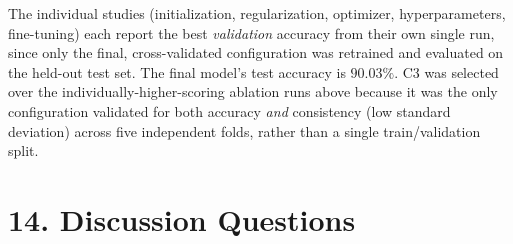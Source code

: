 \documentclass[10pt]{article}
\begin{document}
The individual studies (initialization, regularization,
optimizer, hyperparameters, fine-tuning) each report the best
\emph{validation} accuracy from their own single run, since only the
final, cross-validated configuration was retrained and evaluated on
the held-out test set. The final model's test accuracy is $90.03\%$.  C3 was selected over the
individually-higher-scoring ablation runs above because it was the
only configuration validated for both accuracy \emph{and}
consistency (low standard deviation) across five independent folds,
rather than a single train/validation split.

\section*{14. Discussion Questions}
\end{document}
